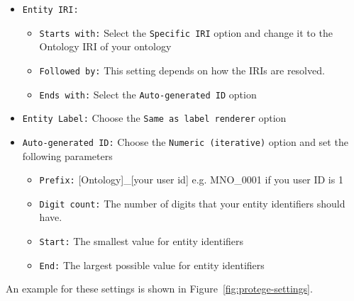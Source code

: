 \begin{itemize}
    \item \texttt{Entity\ IRI:}
    \begin{itemize}
        \item \texttt{Starts with:} Select the \texttt{Specific\ IRI} option and change it to the Ontology IRI of your ontology
        \item \texttt{Followed by:} This setting depends on how the IRIs are resolved.
        \item \texttt{Ends with:} Select the \texttt{Auto-generated\ ID} option
    \end{itemize}
\item \texttt{Entity Label:} Choose the \texttt{Same as label renderer} option
\item \texttt{Auto-generated ID:}  Choose the \texttt{Numeric (iterative)} option and set the following parameters
\begin{itemize}
    \item \texttt{Prefix:} [Ontology]\_{[}your user id{]} e.g. MNO\_0001 if you user ID is 1
    \item \texttt{Digit count:} The number of digits that your entity identifiers should have.
    \item \texttt{Start:} The smallest value for entity identifiers
    \item \texttt{End:} The largest possible value for entity identifiers
\end{itemize}
\end{itemize}
An example for these settings is shown in Figure~\ref{fig:protege-settings}.
